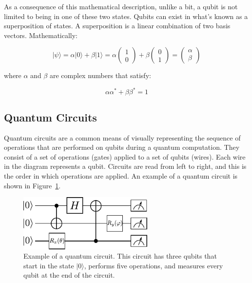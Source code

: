 As a consequence of this mathematical description, unlike a bit, a qubit is not 
limited to being in one of these two states. Qubits can exist in what's known as
a superposition of states. A superposition is a linear combination of two basis 
vectors. Mathematically:

\begin{linenomath}
\begin{equation}
	\vert \psi \rangle = \alpha \vert 0 \rangle + \beta \vert 1 \rangle = \alpha \begin{pmatrix} 1 \\ 0 \end{pmatrix} + \beta \begin{pmatrix} 0 \\ 1 \end{pmatrix} = \begin{pmatrix} \alpha \\ \beta \end{pmatrix}
\label{eq:supos}
\end{equation}
\end{linenomath}
where $\alpha$ and $\beta$ are complex numbers that satisfy:
\begin{linenomath}
\begin{equation}
	\alpha\alpha^* + \beta\beta^* =1
\label{eq:norm}
\end{equation}
\end{linenomath}

\subsection{Quantum Circuits}
\label{sec:circuit}

Quantum circuits are a common means of visually representing the sequence of 
operations that are performed on qubits during a quantum computation. They 
consist of a set of operations (gates) applied to a set of qubits (wires). Each 
wire in the diagram represents a qubit. Circuits are read from left to right, 
and this is the order in which operations are applied.
An example of a quantum circuit is shown in Figure~\ref{fig:circuit}.

\begin{figure}[!htbp]
\centering
	\includegraphics[width=0.60\textwidth]{figures/qcircuit.pdf}
\caption{Example of a quantum circuit. This circuit has three qubits that start 
in the state $\vert 0 \rangle$, performs five operations, and measures every 
qubit at the end of the circuit.}
\label{fig:circuit}
\end{figure}

